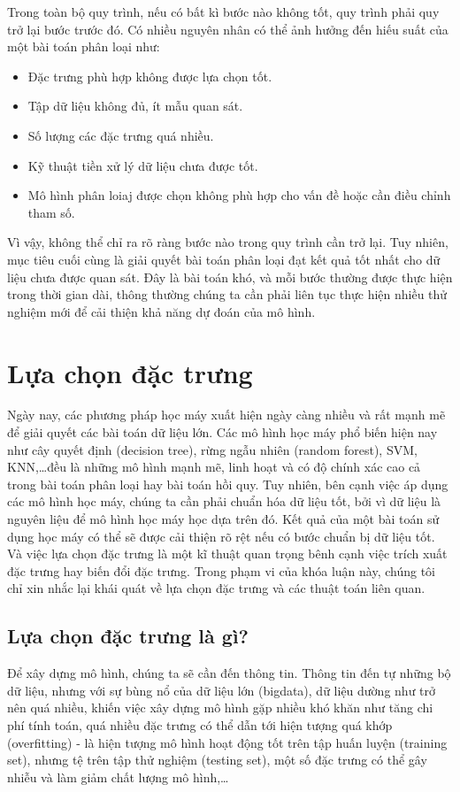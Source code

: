 Trong toàn bộ quy trình, nếu có bất kì bước nào không tốt, quy trình phải quy trở lại bước trước đó. Có nhiều nguyên nhân có thể ảnh hưởng đến hiếu suất của một bài toán phân loại \cite{kotsiantis2007supervised} như:
\begin{itemize}
	\item Đặc trưng phù hợp không được lựa chọn tốt.
	\item Tập dữ liệu không đủ, ít mẫu quan sát.
	\item Số lượng các đặc trưng quá nhiều.
	\item Kỹ thuật tiền xử lý dữ liệu chưa được tốt.
	\item Mô hình phân loiaj được chọn không phù hợp cho vấn đề hoặc cần điều chỉnh tham số.
\end{itemize}

Vì vậy, không thể chỉ ra rõ ràng bước nào trong quy trình cần trở lại. Tuy nhiên, mục tiêu cuối cùng là giải quyết bài toán phân loại đạt kết quả tốt nhất cho dữ liệu chưa được quan sát. Đây là bài toán khó, và mỗi bước thường được thực hiện trong thời gian dài, thông thường chúng ta cần phải liên tục thực hiện nhiều thử nghiệm mới để cải thiện khả năng dự đoán của mô hình.

\section{Lựa chọn đặc trưng}
Ngày nay, các phương pháp học máy xuất hiện ngày càng nhiều và rất mạnh mẽ để giải quyết các bài toán dữ liệu lớn. Các mô hình học máy phổ biến hiện nay như cây quyết định (decision tree), rừng ngẫu nhiên (random forest), SVM, KNN,\ldots đều là những mô hình mạnh mẽ, linh hoạt và có độ chính xác cao cả trong bài toán phân loại hay bài toán hồi quy. Tuy nhiên, bên cạnh việc áp dụng các mô hình học máy, chúng ta cần phải chuẩn hóa dữ liệu tốt, bởi vì dữ liệu là nguyên liệu để mô hình học máy học dựa trên đó. Kết quả của một bài toán sử dụng học máy có thể sẽ được cải thiện rõ rệt nếu có bước chuẩn bị dữ liệu tốt. Và việc lựa chọn đặc trưng là một kĩ thuật quan trọng bênh cạnh việc trích xuất đặc trưng hay biến đổi đặc trưng. Trong phạm vi của khóa luận này, chúng tôi chỉ xin nhắc lại khái quát về lựa chọn đặc trưng và các thuật toán liên quan.

\subsection{Lựa chọn đặc trưng là gì?}
Để xây dựng mô hình, chúng ta sẽ cần đến thông tin. Thông tin đến tự những bộ dữ liệu, nhưng với sự bùng nổ của dữ liệu lớn (bigdata), dữ liệu dường như trở nên quá nhiều, khiến việc xây dựng mô hình gặp nhiều khó khăn như tăng chi phí tính toán, quá nhiều đặc trưng có thể dẫn tới hiện tượng quá khớp (overfitting) - là hiện tượng mô hình hoạt động tốt trên tập huấn luyện (training set), nhưng tệ trên tập thử nghiệm (testing set), một số đặc trưng có thể gây nhiễu và làm giảm chất lượng mô hình,\ldots

